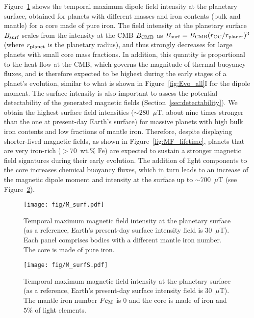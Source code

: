 \documentclass[draft]{agujournal2019} %
\begin{document}
Figure~\ref{fig:MF_surf} shows the temporal maximum dipole field intensity at the planetary surface, obtained for planets with different masses and iron contents (bulk and mantle) for a core made of pure iron. The field intensity at the planetary surface $B_{\rm surf}$ scales from the intensity at the CMB $B_{\rm CMB}$ as $B_{\rm surf}=B_{\rm CMB}(r_{\rm OC}/r_{\rm planet})^{3}$ (where $r_{\rm planet}$ is the planetary radius), and thus strongly decreases for large planets with small core mass fractions. In addition, this quantity is proportional to the heat flow at the CMB, which governs the magnitude of thermal buoyancy fluxes, and is therefore expected to be highest during the early stages of a planet's evolution, similar to what is shown in Figure~\ref{fig:Evo_all}I for the dipole moment. The surface intensity is also important to assess the potential detectability of the generated magnetic fields (Section~\ref{sec:detectability}). We obtain the highest surface field intensities ($\sim 280$~$\mu$T, about nine times stronger than the one at present-day Earth's surface) for massive planets with high bulk iron contents and low fractions of mantle iron. Therefore, despite displaying shorter-lived magnetic fields, as shown in Figure~\ref{fig:MF_lifetime}, planets that are very iron-rich ($>70$~wt.\% Fe) are expected to sustain a stronger magnetic field signatures during their early evolution. The addition of light components to the core increases chemical buoyancy fluxes, which in turn leads to an increase of the magnetic dipole moment and intensity at the surface up to $\sim700$~$\mu$T (see Figure~\ref{fig:MF_surf_LE}). 

\begin{figure}
\texttt{[image: fig/M\_surf.pdf]}
\caption{Temporal maximum magnetic field intensity at the planetary surface (as a reference, Earth's present-day surface intensity field is $30$~$\mu$T). Each panel comprises bodies with a different mantle iron number. The core is made of pure iron.}
\label{fig:MF_surf}
\end{figure}

\begin{figure}
\texttt{[image: fig/M\_surfS.pdf]}
\caption{Temporal maximum magnetic field intensity at the planetary surface (as a reference, Earth's present-day surface intensity field is $30$~$\mu$T). The mantle iron number $Fe_{\rm M}$ is 0 and the core is made of iron and $5$\% of light elements.}
\label{fig:MF_surf_LE}
\end{figure}
\end{document}
